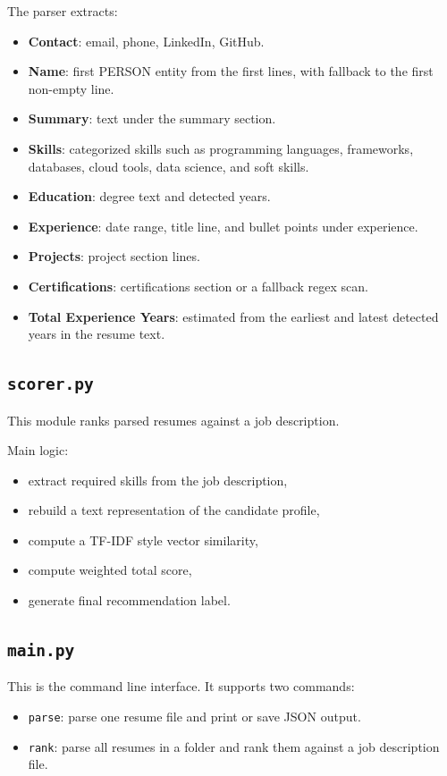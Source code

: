 \documentclass[12pt,a4paper]{article}
\begin{document}
The parser extracts:
\begin{itemize}[leftmargin=1.5em]
    \item \textbf{Contact}: email, phone, LinkedIn, GitHub.
    \item \textbf{Name}: first PERSON entity from the first lines, with fallback to the first non-empty line.
    \item \textbf{Summary}: text under the summary section.
    \item \textbf{Skills}: categorized skills such as programming languages, frameworks, databases, cloud tools, data science, and soft skills.
    \item \textbf{Education}: degree text and detected years.
    \item \textbf{Experience}: date range, title line, and bullet points under experience.
    \item \textbf{Projects}: project section lines.
    \item \textbf{Certifications}: certifications section or a fallback regex scan.
    \item \textbf{Total Experience Years}: estimated from the earliest and latest detected years in the resume text.
\end{itemize}

\subsection{\texttt{scorer.py}}
This module ranks parsed resumes against a job description.

Main logic:
\begin{itemize}[leftmargin=1.5em]
    \item extract required skills from the job description,
    \item rebuild a text representation of the candidate profile,
    \item compute a TF-IDF style vector similarity,
    \item compute weighted total score,
    \item generate final recommendation label.
\end{itemize}

\subsection{\texttt{main.py}}
This is the command line interface. It supports two commands:
\begin{itemize}[leftmargin=1.5em]
    \item \texttt{parse}: parse one resume file and print or save JSON output.
    \item \texttt{rank}: parse all resumes in a folder and rank them against a job description file.
\end{itemize}
\end{document}
